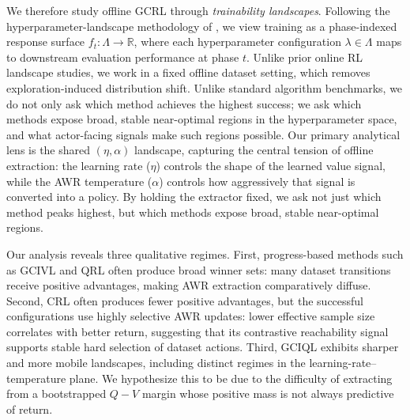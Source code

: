 We therefore study offline GCRL through \emph{trainability landscapes}.
Following the hyperparameter-landscape methodology of \citet{mohan-automlconf23a}, we view training as a phase-indexed response surface \(f_t:\Lambda\to\mathbb{R}\), where each hyperparameter configuration \(\lambda\in\Lambda\) maps to downstream evaluation performance at phase \(t\).
Unlike prior online RL landscape studies, we work in a fixed offline dataset setting, which removes exploration-induced distribution shift.
Unlike standard algorithm benchmarks, we do not only ask which method achieves the highest success; we ask which methods expose broad, stable near-optimal regions in the hyperparameter space, and what actor-facing signals make such regions possible.
Our primary analytical lens is the shared $(\eta,\alpha)$ landscape, capturing the central tension of offline extraction: the learning rate ($\eta$) controls the shape of the learned value signal, while the AWR temperature ($\alpha$) controls how aggressively that signal is converted into a policy.
By holding the extractor fixed, we ask not just which method peaks highest, but which methods expose broad, stable near-optimal regions.

Our analysis reveals three qualitative regimes.
First, progress-based methods such as GCIVL and QRL often produce broad winner sets: many dataset transitions
receive positive advantages, making AWR extraction comparatively diffuse.
Second, CRL often produces fewer positive advantages, but the successful configurations use highly selective AWR updates: lower effective sample size correlates with better return, suggesting that its contrastive reachability signal supports stable hard selection of dataset actions.
Third, GCIQL exhibits sharper and more mobile landscapes, including distinct regimes in the learning-rate--temperature plane.
We hypothesize this to be due to the difficulty of extracting from a bootstrapped \(Q-V\) margin whose positive mass is not always predictive of return.


